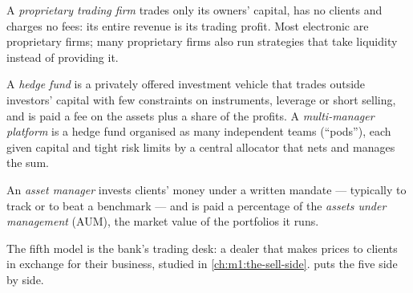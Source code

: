 \begin{definition}\label{def:m1:what-a-trading-firm-does:prop}
A \emph{proprietary trading firm} trades
only its owners' capital, has no clients and charges no fees: its entire
revenue is its trading profit. Most electronic  are proprietary
firms; many proprietary firms also run strategies that take liquidity
instead of providing it.
\end{definition}

\begin{definition}\label{def:m1:what-a-trading-firm-does:hedge-fund}
A \emph{hedge fund} is a privately offered investment
vehicle that trades outside investors' capital with few constraints on
instruments, leverage or short selling, and is paid a fee on the assets plus
a share of the profits. A \emph{multi-manager platform}
is a hedge fund organised as many independent teams (``pods''), each given
capital and tight risk limits by a central allocator that nets and manages
the sum.
\end{definition}

\begin{definition}\label{def:m1:what-a-trading-firm-does:asset-manager}
An \emph{asset manager} invests clients' money under a
written mandate --- typically to track or to beat a benchmark --- and is paid
a percentage of the \emph{assets under management}
(AUM), the market value of the portfolios it runs.
\end{definition}

The fifth model is the bank's trading desk: a dealer that makes prices to
clients in exchange for their business, studied in \cref{ch:m1:the-sell-side}.
 puts the five side by side.

